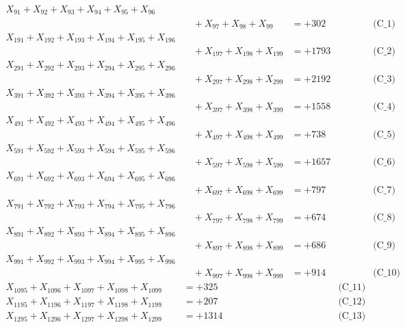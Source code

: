 \documentclass[a4paper,10pt]{article}
\begin{document}
\allowdisplaybreaks
{\small
\begin{align}
X_{91} + X_{92} + X_{93} + X_{94} + X_{95} + X_{96} \\[0.1ex]
&\quad  + X_{97} + X_{98} + X_{99} &= +302 && \text{(C\_1)} \\
X_{191} + X_{192} + X_{193} + X_{194} + X_{195} + X_{196} \\[0.1ex]
&\quad  + X_{197} + X_{198} + X_{199} &= +1793 && \text{(C\_2)} \\
X_{291} + X_{292} + X_{293} + X_{294} + X_{295} + X_{296} \\[0.1ex]
&\quad  + X_{297} + X_{298} + X_{299} &= +2192 && \text{(C\_3)} \\
X_{391} + X_{392} + X_{393} + X_{394} + X_{395} + X_{396} \\[0.1ex]
&\quad  + X_{397} + X_{398} + X_{399} &= +1558 && \text{(C\_4)} \\
X_{491} + X_{492} + X_{493} + X_{494} + X_{495} + X_{496} \\[0.1ex]
&\quad  + X_{497} + X_{498} + X_{499} &= +738 && \text{(C\_5)} \\
\allowbreak
X_{591} + X_{592} + X_{593} + X_{594} + X_{595} + X_{596} \\[0.1ex]
&\quad  + X_{597} + X_{598} + X_{599} &= +1657 && \text{(C\_6)} \\
X_{691} + X_{692} + X_{693} + X_{694} + X_{695} + X_{696} \\[0.1ex]
&\quad  + X_{697} + X_{698} + X_{699} &= +797 && \text{(C\_7)} \\
X_{791} + X_{792} + X_{793} + X_{794} + X_{795} + X_{796} \\[0.1ex]
&\quad  + X_{797} + X_{798} + X_{799} &= +674 && \text{(C\_8)} \\
X_{891} + X_{892} + X_{893} + X_{894} + X_{895} + X_{896} \\[0.1ex]
&\quad  + X_{897} + X_{898} + X_{899} &= +686 && \text{(C\_9)} \\
X_{991} + X_{992} + X_{993} + X_{994} + X_{995} + X_{996} \\[0.1ex]
&\quad  + X_{997} + X_{998} + X_{999} &= +914 && \text{(C\_10)} \\
\allowbreak
X_{1095} + X_{1096} + X_{1097} + X_{1098} + X_{1099} &= +325 && \text{(C\_11)} \\
X_{1195} + X_{1196} + X_{1197} + X_{1198} + X_{1199} &= +207 && \text{(C\_12)} \\
X_{1295} + X_{1296} + X_{1297} + X_{1298} + X_{1299} &= +1314 && \text{(C\_13)} \\

\end{align}}
\end{document}
